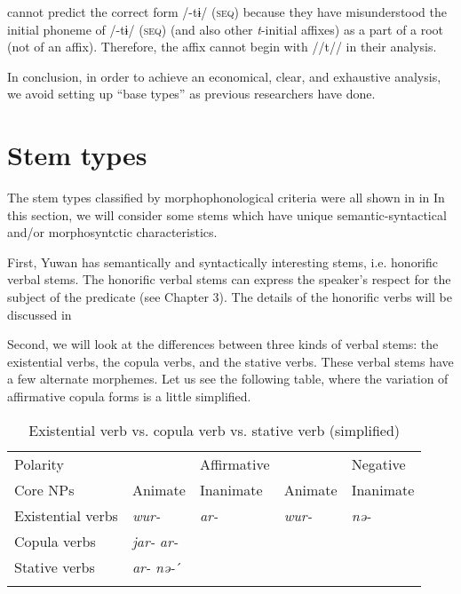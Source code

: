 \citet{UchimaEtAl1976} cannot predict the correct form /-tɨ/ (\textsc{seq}) because they have misunderstood the initial phoneme of /-tɨ/ (\textsc{seq}) (and also other \textit{t}-initial affixes) as a part of a root (not of an affix). Therefore, the affix cannot begin with //t// in their analysis.

  In conclusion, in order to achieve an economical, clear, and exhaustive analysis, we avoid setting up “base types” as previous researchers have done.

\section{Stem types}

The stem types classified by morphophonological criteria were all shown in  in  In this section, we will consider some stems which have unique semantic-syntactical and/or morphosyntctic characteristics.

  First, Yuwan has semantically and syntactically interesting stems, i.e. honorific verbal stems. The honorific verbal stems can express the speaker’s respect for the subject of the predicate (see Chapter 3). The details of the honorific verbs will be discussed in 

  Second, we will look at the differences between three kinds of verbal stems: the existential verbs, the copula verbs, and the stative verbs. These verbal stems have a few alternate morphemes. Let us see the following table, where the variation of affirmative copula forms is a little simplified.

\begin{table}
\caption{\label{tab:key:71}Existential verb vs. copula verb vs. stative verb (simplified)}
\begin{tabular}{l ll ll}
\lspbottomrule
Polarity &&  Affirmative &&  Negative\\
Core NPs  & Animate  & Inanimate  & Animate  & Inanimate\\
\midrule
Existential verbs  & \textit{wur-} &  \textit{ar-} &  \textit{wur-} &  \textit{nə-}\\
Copula verbs & \textit{jar-}  \textit{ar-}                                            \\
Stative verbs&   \textit{ar-}  \textit{nə-}´\\
\lspbottomrule
\end{tabular}
\end{table}

